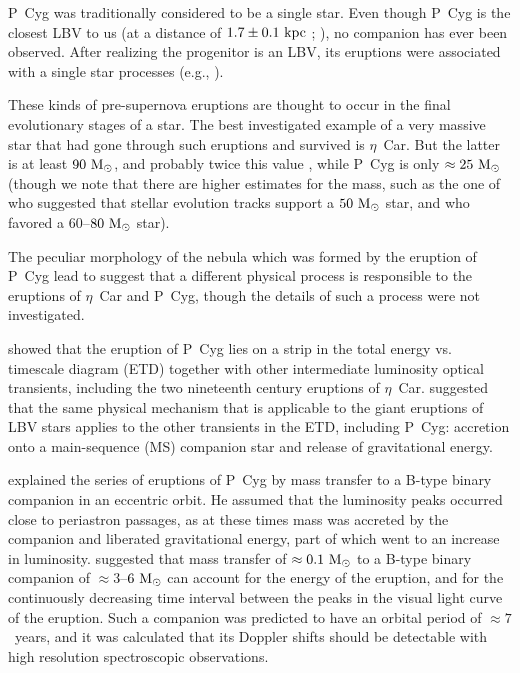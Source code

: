 \documentclass[twocolumn]{aastex62}
\def \kpc{~\rm{kpc}}
\def \etc{$\eta$~Car}
\def \rmModot{~\rm{M_{\sun}}}
\begin{document}
P~Cyg was traditionally considered to be a single star.
Even though P~Cyg is the closest LBV to us (at a distance of $1.7 \pm 0.1 \kpc$ ; \citealt{Najarroetal1997}), no companion has ever been observed.
After realizing the progenitor is an LBV, its eruptions were associated with a single star processes (e.g., \citealt{HumphreysDavidson1994,LamersdeGroot1992}).

These kinds of pre-supernova eruptions are thought to occur in the final evolutionary stages of a star.
The best investigated example of a very massive star that had gone through such eruptions and survived is \etc \citep{HumphreysMartin2012}.
But the latter is at least $90 \rmModot$, and probably twice this value \citep{KashiSoker2016Massive}, while P~Cyg is only $\approx 25 \rmModot$
(though we note that there are higher estimates for the mass, such as the one of 
\cite{ElEidHartmann1993} who suggested that stellar evolution tracks support a $50 \rmModot$ star, and \citealt{Lamersetal1983a, Lamersetal1983b}
who favored a $60$--$80 \rmModot$ star).

The peculiar morphology of the nebula which was formed by the eruption of P~Cyg
\citep{Notaetal1995} lead \cite{IsraeliandeGroot1999} to suggest that a different physical process is responsible to the eruptions of $\eta$~Car and P~Cyg,
though the details of such a process were not investigated.

\cite{Kashietal2010} showed that the eruption of P~Cyg lies on a
strip in the total energy vs. timescale diagram (ETD) together with other intermediate
luminosity optical transients, including the two nineteenth century eruptions of \etc.
\cite{KashiSoker2010b} suggested that the same physical mechanism that is applicable to the giant eruptions of LBV stars applies to the other transients in the ETD, including P~Cyg: accretion onto a main-sequence (MS) companion star and release of gravitational energy.

\cite{Kashi2010} explained the series of eruptions of P~Cyg by mass transfer to a B-type binary companion in an eccentric orbit.
He assumed that the luminosity peaks occurred close to periastron passages, as
at these times mass was accreted by the companion and liberated gravitational
energy, part of which went to an increase in luminosity.
\cite{Kashi2010} suggested that mass transfer of $\approx 0.1 \rmModot$ to a B-type binary
companion of $\approx 3$--$6 \rmModot$ can account for the energy of the
eruption, and for the continuously decreasing time interval between the peaks in
the visual light curve of the eruption.
Such a companion was predicted to have an orbital period of $\approx 7$~years, and it was calculated that its Doppler shifts should be detectable with high resolution spectroscopic observations.
\end{document}
